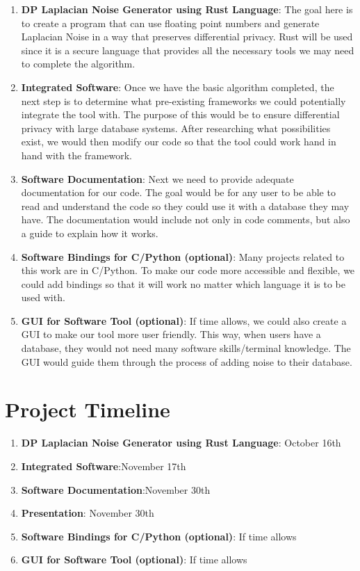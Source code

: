 \documentclass[11pt]{exam}
\begin{document}
\begin{enumerate}
    \item \textbf{DP Laplacian Noise Generator using Rust Language}: The goal here is to create a program that can use floating point numbers and generate Laplacian Noise in a way that preserves differential privacy. Rust will be used since it is a secure language that provides all the necessary tools we may need to complete the algorithm.
        
    \item \textbf{Integrated Software}: Once we have the basic algorithm completed, the next step is to determine what pre-existing frameworks we could potentially integrate the tool with. The purpose of this would be to ensure differential privacy with large database systems. After researching what possibilities exist, we would then modify our code so that the tool could work hand in hand with the framework.
    \item \textbf{Software Documentation}: Next we need to provide adequate documentation for our code. The goal would be for any user to be able to read and understand the code so they could use it with a database they may have. The documentation would include not only in code comments, but also a guide to explain how it works.
    \item \textbf{Software Bindings for C/Python (optional)}: Many projects related to this work are in C/Python. To make our code more accessible and flexible, we could add bindings so that it will work no matter which language it is to be used with. 
    \item \textbf{GUI for Software Tool (optional)}: If time allows, we could also create a GUI to make our tool more user friendly. This way, when users have a database, they would not need many software skills/terminal knowledge. The GUI would guide them through the process of adding noise to their database.
\end{enumerate}

\section{Project Timeline}
\begin{enumerate}
    \item \textbf{DP Laplacian Noise Generator using Rust Language}: October 16th
    \item \textbf{Integrated Software}:November 17th
    \item \textbf{Software Documentation}:November 30th
    \item \textbf{Presentation}: November 30th
    \item \textbf{Software Bindings for C/Python (optional)}: If time allows
     \item \textbf{GUI for Software Tool (optional)}: If time allows
\end{enumerate}
    

\cite{M}
\cite{DLM}
\end{document}
